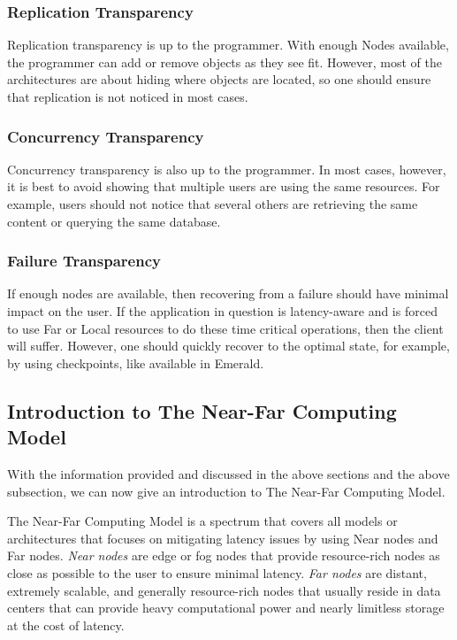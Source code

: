 \subsubsection{Replication Transparency}
Replication transparency is up to the programmer. With enough Nodes available, the programmer can add or remove objects as they see fit. However, most of the architectures are about hiding where objects are located, so one should ensure that replication is not noticed in most cases.

\subsubsection{Concurrency Transparency}
Concurrency transparency is also up to the programmer. In most cases, however, it is best to avoid showing that multiple users are using the same resources. For example, users should not notice that several others are retrieving the same content or querying the same database. 

\subsubsection{Failure Transparency}
If enough nodes are available, then recovering from a failure should have minimal impact on the user. If the application in question is latency-aware and is forced to use Far or Local resources to do these time critical operations, then the client will suffer. However, one should quickly recover to the optimal state, for example, by using checkpoints, like available in Emerald.

\subsection{Introduction to The Near-Far Computing Model}
With the information provided and discussed in the above sections and the above subsection, we can now give an introduction to The Near-Far Computing Model.

The Near-Far Computing Model is a spectrum that covers all models or architectures that focuses on mitigating latency issues by using Near nodes and Far nodes. \textit{Near nodes} are edge or fog nodes that provide resource-rich nodes as close as possible to the user to ensure minimal latency. \textit{Far nodes} are distant, extremely scalable, and generally resource-rich nodes that usually reside in data centers that can provide heavy computational power and nearly limitless storage at the cost of latency.

